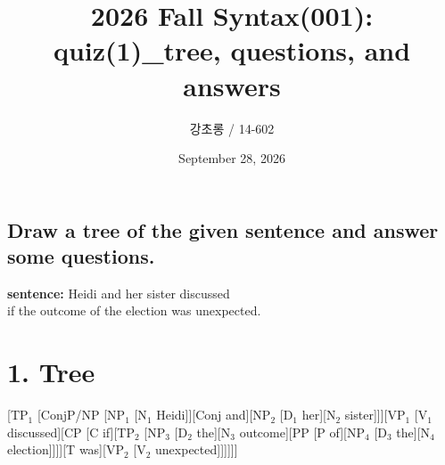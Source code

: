 \documentclass[11pt]{article}
\title{2026 Fall Syntax(001): \\ \medskip \large{quiz(1)\_tree, questions, and answers}}
\author{강초롱  /  14-602}
\date{September 28, 2026}
\begin{document}
\maketitle
\thispagestyle{firstpage}
\bigskip
\begin{centering}
\section[Q. Draw a tree of the given sentence and answer some questions.]{Draw a tree of the given sentence and answer some questions.\protect\footnotemark}
\end{centering}
\bigskip
\begin{center}
  {\large
    \textbf{sentence:} Heidi and her sister discussed\\
    if the outcome of the election was unexpected.
  }
\end{center}

\bigskip
\centering
\section{1. Tree}
\bigskip
\noindent
\begin{gpstree}{}
[TP$_1$ [ConjP/NP [NP$_1$ [N$_1$ Heidi]][Conj and][NP$_2$ [D$_1$ her][N$_2$ sister]]][VP$_1$ [V$_1$ discussed][CP [C if][TP$_2$ [NP$_3$ [D$_2$ the][N$_3$ outcome][PP [P of][NP$_4$ [D$_3$ the][N$_4$ election]]]][T was][VP$_2$ [V$_2$ unexpected]]]]]]
\end{gpstree}

\newpage
\end{document}
